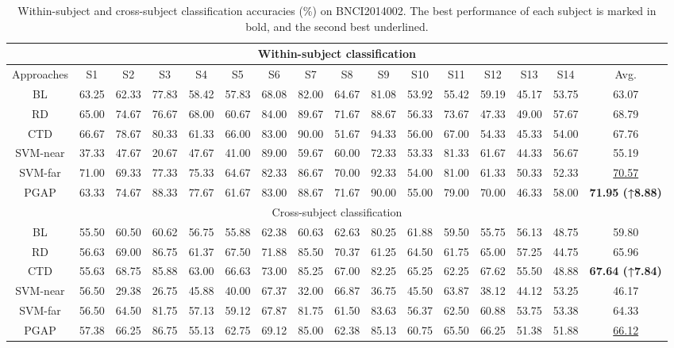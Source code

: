 \documentclass[journal,twocolumn]{IEEEtran}
\begin{document}
\begin{table}[htpb] \centering
  \caption{Within-subject and cross-subject classification accuracies (\%) on BNCI2014002. The best performance of each subject is marked in bold, and the second best underlined.}
  \label{tab:2014002-result}
  \begin{tabular}{c|c|c|c|c|c|c|c|c|c|c|c|c|c|c|c}
  \toprule
  \multicolumn{16}{c}{Within-subject classification} \\
  \midrule
  Approaches & S1 & S2 & S3 & S4 & S5 & S6 & S7 & S8 & S9 & S10 & S11 & S12 & S13 & S14 & Avg. \\
  \midrule
  BL & 63.25 & 62.33 & 77.83 & 58.42 & 57.83 & 68.08 & 82.00 & 64.67 & 81.08 & 53.92 & 55.42 & 59.19 & 45.17 & 53.75 & 63.07 \\
  RD & 65.00 & 74.67 & 76.67 & 68.00 & 60.67 & 84.00 & 89.67 & 71.67 & 88.67 & 56.33 & 73.67 & 47.33 & 49.00 & 57.67 & 68.79 \\
  CTD & 66.67 & 78.67 & 80.33 & 61.33 & 66.00 & 83.00 & 90.00 & 51.67 & 94.33 & 56.00 & 67.00 & 54.33 & 45.33 & 54.00 & 67.76 \\
  SVM-near & 37.33 & 47.67 & 20.67 & 47.67 & 41.00 & 89.00 & 59.67 & 60.00 & 72.33 & 53.33 & 81.33 & 61.67 & 44.33 & 56.67 & 55.19 \\
  SVM-far & 71.00 & 69.33 & 77.33 & 75.33 & 64.67 & 82.33 & 86.67 & 70.00 & 92.33 & 54.00 & 81.00 & 61.33 & 50.33 & 52.33 & \underline{70.57} \\
  PGAP & 63.33 & 74.67 & 88.33 & 77.67 & 61.67 & 83.00 & 88.67 & 71.67 & 90.00 & 55.00 & 79.00 & 70.00 & 46.33 & 58.00 & \textbf{71.95 (↑8.88)} \\
  \midrule
  \multicolumn{16}{c}{Cross-subject classification} \\
  \midrule
  BL & 55.50 & 60.50 & 60.62 & 56.75 & 55.88 & 62.38 & 60.63 & 62.63 & 80.25 & 61.88 & 59.50 & 55.75 & 56.13 & 48.75 & 59.80 \\
  RD & 56.63 & 69.00 & 86.75 & 61.37 & 67.50 & 71.88 & 85.50 & 70.37 & 61.25 & 64.50 & 61.75 & 65.00 & 57.25 & 44.75 & 65.96 \\
  CTD & 55.63 & 68.75 & 85.88 & 63.00 & 66.63 & 73.00 & 85.25 & 67.00 & 82.25 & 65.25 & 62.25 & 67.62 & 55.50 & 48.88 & \textbf{67.64 (↑7.84)} \\
  SVM-near & 56.50 & 29.38 & 26.75 & 45.88 & 40.00 & 67.37 & 32.00 & 66.87 & 36.75 & 45.50 & 63.87 & 38.12 & 44.12 & 53.25 & 46.17 \\
  SVM-far & 56.50 & 64.50 & 81.75 & 57.13 & 59.12 & 67.87 & 81.75 & 61.50 & 83.63 & 56.37 & 62.50 & 60.88 & 53.75 & 53.38 & 64.33 \\
  PGAP & 57.38 & 66.25 & 86.75 & 55.13 & 62.75 & 69.12 & 85.00 & 62.38 & 85.13 & 60.75 & 65.50 & 66.25 & 51.38 & 51.88 & \underline{66.12} \\
  \bottomrule
  \end{tabular}
\end{table}
\end{document}
